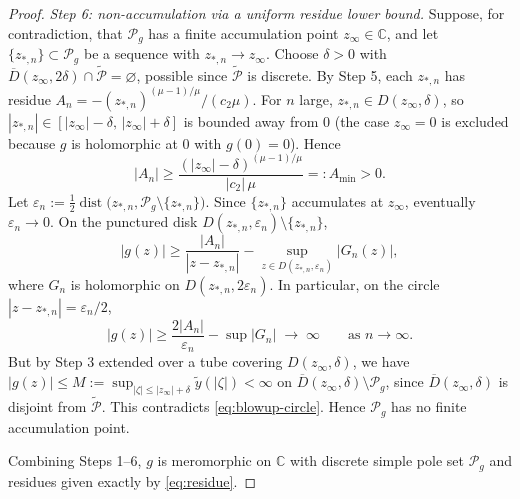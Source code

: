 \documentclass[11pt]{article}
\theoremstyle{definition}
\theoremstyle{remark}
\begin{document}
\begin{proof}
\emph{Step 6: non-accumulation via a uniform residue lower bound.} Suppose, for contradiction, that $\mathcal{P}_{g}$ has a finite accumulation point $z_{\infty}\in\mathbb{C}$, and let $\{z_{*,n}\}\subset\mathcal{P}_{g}$ be a sequence with $z_{*,n}\to z_{\infty}$. Choose $\delta>0$ with $\overline{D}(z_{\infty},2\delta)\cap\widetilde{\mathcal{P}}=\varnothing$, possible since $\widetilde{\mathcal{P}}$ is discrete. By Step 5, each $z_{*,n}$ has residue $A_{n}=-(z_{*,n})^{(\mu-1)/\mu}/(c_{2}\mu)$. For $n$ large, $z_{*,n}\in D(z_{\infty},\delta)$, so $|z_{*,n}|\in[|z_{\infty}|-\delta,\,|z_{\infty}|+\delta]$ is bounded away from $0$ (the case $z_{\infty}=0$ is excluded because $g$ is holomorphic at $0$ with $g(0)=0$). Hence
\begin{equation}
|A_{n}|\ge\frac{(|z_{\infty}|-\delta)^{(\mu-1)/\mu}}{|c_{2}|\,\mu}=:A_{\min}>0.
\label{eq:residue-lower}
\end{equation}
Let $\varepsilon_{n}:=\tfrac{1}{2}\operatorname{dist}\bigl(z_{*,n},\mathcal{P}_{g}\setminus\{z_{*,n}\}\bigr)$. Since $\{z_{*,n}\}$ accumulates at $z_{\infty}$, eventually $\varepsilon_{n}\to 0$. On the punctured disk $D(z_{*,n},\varepsilon_{n})\setminus\{z_{*,n}\}$,
\begin{equation}
|g(z)|\ge\frac{|A_{n}|}{|z-z_{*,n}|}-\sup_{z\in D(z_{*,n},\varepsilon_{n})}|G_{n}(z)|,
\label{eq:blowup-lower}
\end{equation}
where $G_{n}$ is holomorphic on $D(z_{*,n},2\varepsilon_{n})$. In particular, on the circle $|z-z_{*,n}|=\varepsilon_{n}/2$,
\begin{equation}
|g(z)|\ge\frac{2|A_{n}|}{\varepsilon_{n}}-\sup|G_{n}|\;\longrightarrow\;\infty
\qquad\text{as }n\to\infty.
\label{eq:blowup-circle}
\end{equation}
But by Step 3 extended over a tube covering $D(z_{\infty},\delta)$, we have $|g(z)|\le M:=\sup_{|\zeta|\le|z_{\infty}|+\delta}\tilde y(|\zeta|)<\infty$ on $\overline{D}(z_{\infty},\delta)\setminus\mathcal{P}_{g}$, since $\overline{D}(z_{\infty},\delta)$ is disjoint from $\widetilde{\mathcal{P}}$. This contradicts \eqref{eq:blowup-circle}. Hence $\mathcal{P}_{g}$ has no finite accumulation point.

Combining Steps 1--6, $g$ is meromorphic on $\mathbb{C}$ with discrete simple pole set $\mathcal{P}_{g}$ and residues given exactly by \eqref{eq:residue}.
\end{proof}
\end{document}
